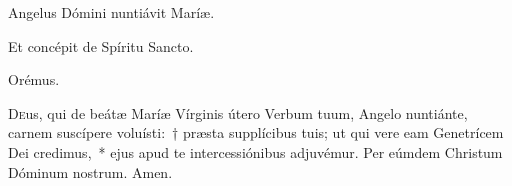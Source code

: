 
\vv Angelus Dómini nuntiávit Maríæ.

\rr Et concépit de Spíritu Sancto.

Orémus.

\lettrine{D}{e}us, qui de beátæ Maríæ Vírginis útero Verbum tuum, Angelo nuntiánte, carnem suscípere voluísti:~† præsta supplícibus tuis; ut qui vere eam Genetrícem Dei credimus,~* ejus apud te intercessiónibus adjuvémur. Per eúmdem Christum Dóminum nostrum. \rr Amen.
